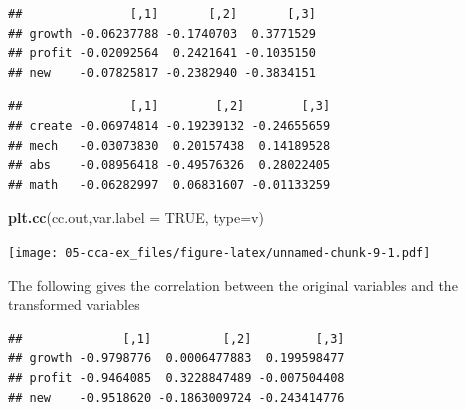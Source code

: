 \documentclass[
]{book}
\newenvironment{Shaded}{\begin{snugshade}}{\end{snugshade}}
\newcommand{\AttributeTok}[1]{\textcolor[rgb]{0.13,0.29,0.53}{#1}}
\newcommand{\ConstantTok}[1]{\textcolor[rgb]{0.56,0.35,0.01}{#1}}
\newcommand{\FunctionTok}[1]{\textcolor[rgb]{0.13,0.29,0.53}{\textbf{#1}}}
\newcommand{\NormalTok}[1]{#1}
\newcommand{\SpecialCharTok}[1]{\textcolor[rgb]{0.81,0.36,0.00}{\textbf{#1}}}
\newcommand{\StringTok}[1]{\textcolor[rgb]{0.31,0.60,0.02}{#1}}
\theoremstyle{definition}
\theoremstyle{definition}
\theoremstyle{definition}
\theoremstyle{definition}
\theoremstyle{remark}
\begin{document}
\begin{Shaded}
\end{Shaded}

\begin{verbatim}
##               [,1]       [,2]       [,3]
## growth -0.06237788 -0.1740703  0.3771529
## profit -0.02092564  0.2421641 -0.1035150
## new    -0.07825817 -0.2382940 -0.3834151
\end{verbatim}

\begin{Shaded}
\end{Shaded}

\begin{verbatim}
##               [,1]        [,2]        [,3]
## create -0.06974814 -0.19239132 -0.24655659
## mech   -0.03073830  0.20157438  0.14189528
## abs    -0.08956418 -0.49576326  0.28022405
## math   -0.06282997  0.06831607 -0.01133259
\end{verbatim}

\begin{Shaded}
\begin{Highlighting}[]
\FunctionTok{plt.cc}\NormalTok{(cc.out,}\AttributeTok{var.label =} \ConstantTok{TRUE}\NormalTok{,}
       \AttributeTok{type=}\StringTok{\textquotesingle{}v\textquotesingle{}}\NormalTok{)}
\end{Highlighting}
\end{Shaded}

\texttt{[image: 05-cca-ex\_files/figure-latex/unnamed-chunk-9-1.pdf]}

The following gives the correlation between the original variables and the transformed variables

\begin{Shaded}
\end{Shaded}

\begin{verbatim}
##              [,1]          [,2]         [,3]
## growth -0.9798776  0.0006477883  0.199598477
## profit -0.9464085  0.3228847489 -0.007504408
## new    -0.9518620 -0.1863009724 -0.243414776
\end{verbatim}
\end{document}
